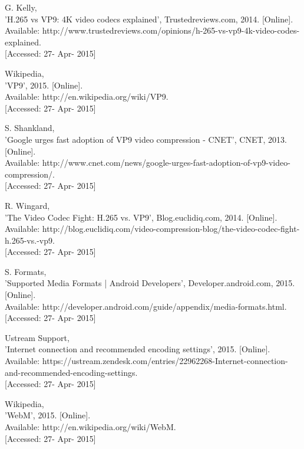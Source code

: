 \documentclass[]{article}
\begin{document}
\begin{enumerate}[label={[\arabic*]}]
\item G. Kelly,\\{} 'H.265 vs VP9: 4K video codecs explained', Trustedreviews.com, 2014. [Online].\\{} Available: http://www.trustedreviews.com/opinions/h-265-vs-vp9-4k-video-codes-explained. \\{}[Accessed: 27- Apr- 2015]

\item  Wikipedia,\\{} 'VP9', 2015. [Online].\\{} Available: http://en.wikipedia.org/wiki/VP9. \\{}[Accessed: 27- Apr- 2015]

\item S. Shankland, \\{}'Google urges fast adoption of VP9 video compression - CNET', CNET, 2013. [Online]. \\{}Available: http://www.cnet.com/news/google-urges-fast-adoption-of-vp9-video-compression/.\\{} [Accessed: 27- Apr- 2015]

\item R. Wingard, \\{}'The Video Codec Fight: H.265 vs. VP9', Blog.euclidiq.com, 2014. [Online].\\{} Available: http://blog.euclidiq.com/video-compression-blog/the-video-codec-fight-h.265-vs.-vp9. \\{}[Accessed: 27- Apr- 2015]

\item S. Formats,\\{} 'Supported Media Formats | Android Developers', Developer.android.com, 2015. [Online].\\{} Available: http://developer.android.com/guide/appendix/media-formats.html.\\{} [Accessed: 27- Apr- 2015]

\item  Ustream Support,\\{} 'Internet connection and recommended encoding settings', 2015. [Online].\\{} Available: https://ustream.zendesk.com/entries/22962268-Internet-connection-and-recommended-encoding-settings.\\{} [Accessed: 27- Apr- 2015]

\item  Wikipedia,\\{} 'WebM', 2015. [Online].\\{} Available: http://en.wikipedia.org/wiki/WebM.\\{} [Accessed: 27- Apr- 2015]


\end{enumerate}
\end{document}
